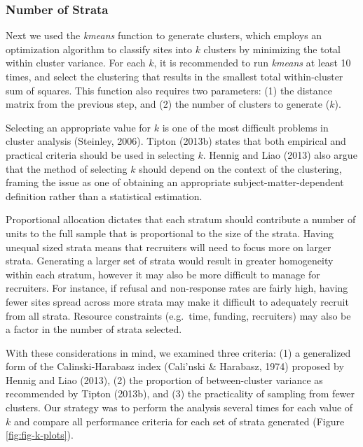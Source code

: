 \documentclass[
  english,
  man,floatsintext]{apa6}
\begin{document}
\hypertarget{number-of-strata}{%
\subsubsection{Number of Strata}\label{number-of-strata}}

Next we used the \emph{kmeans} function to generate clusters, which employs an optimization algorithm to classify sites into \(k\) clusters by minimizing the total within cluster variance. For each \(k\), it is recommended to run \emph{kmeans} at least 10 times, and select the clustering that results in the smallest total within-cluster sum of squares. This function also requires two parameters: (1) the distance matrix from the previous step, and (2) the number of clusters to generate (\(k\)).

Selecting an appropriate value for \(k\) is one of the most difficult problems in cluster analysis (Steinley, 2006). Tipton (2013b) states that both empirical and practical criteria should be used in selecting \(k\). Hennig and Liao (2013) also argue that the method of selecting \(k\) should depend on the context of the clustering, framing the issue as one of obtaining an appropriate subject-matter-dependent definition rather than a statistical estimation.

Proportional allocation dictates that each stratum should contribute a number of units to the full sample that is proportional to the size of the strata. Having unequal sized strata means that recruiters will need to focus more on larger strata. Generating a larger set of strata would result in greater homogeneity within each stratum, however it may also be more difficult to manage for recruiters. For instance, if refusal and non-response rates are fairly high, having fewer sites spread across more strata may make it difficult to adequately recruit from all strata. Resource constraints (e.g.~time, funding, recruiters) may also be a factor in the number of strata selected.

With these considerations in mind, we examined three criteria: (1) a generalized form of the Calinski-Harabasz index (Cali\a'nski \& Harabasz, 1974) proposed by Hennig and Liao (2013), (2) the proportion of between-cluster variance as recommended by Tipton (2013b), and (3) the practicality of sampling from fewer clusters. Our strategy was to perform the analysis several times for each value of \(k\) and compare all performance criteria for each set of strata generated (Figure \ref{fig:fig-k-plots}).
\end{document}
